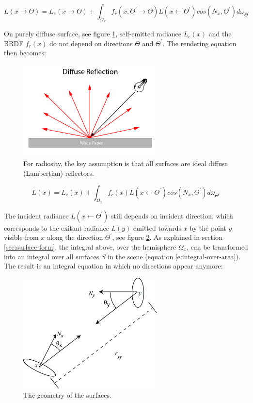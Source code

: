 \begin{equation*}
	L(x\to\Theta)=L_e(x\to\Theta)+\int_{\Omega_x}f_r(x,\Theta^{'}\to\Theta)L(x\leftarrow\Theta^{'})cos(N_x,\Theta^{'})d\omega_{\Theta^{'}}
\end{equation*}

On purely diffuse surface, see figure \ref{f:radiosity-diffuse}, self-emitted radiance $L_e(x)$ and the BRDF $f_r(x)$ do not depend on directions $\Theta$ and $\Theta^{'}$. The rendering equation then becomes:

\begin{figure}
\sidecaption
	\includegraphics[width=0.65\textwidth]{graphics/gi/path-23}
	\caption{For radiosity, the key assumption is that all surfaces are ideal diffuse (Lambertian) reflectors.}
	\label{f:radiosity-diffuse}
\end{figure}

\begin{equation*}
	L(x)=L_e(x)+\int_{\Omega_x}f_r(x)L(x\leftarrow\Theta^{'})cos(N_x,\Theta^{'})d\omega_{\Theta^{'}}
\end{equation*}

The incident radiance $L(x\leftarrow\Theta^{'})$ still depends on incident direction, which corresponds to the exitant radiance $L(y)$ emitted towards $x$ by the point $y$ visible from $x$ along the direction $\Theta^{'}$, see figure \ref{f:The-geometry-of-the-surfaces}. As explained in section \ref{sec:surface-form}, the integral above, over the hemisphere $\Omega_x$, can be transformed into an integral over all surfaces $S$ in the scene (equation \ref{e:integral-over-area}). The result is an integral equation in which no directions appear anymore:

\begin{figure}
\sidecaption
	\includegraphics[width=0.65\textwidth]{graphics/gi/path-18}
	\caption{The geometry of the surfaces.}
	\label{f:The-geometry-of-the-surfaces}
\end{figure}

